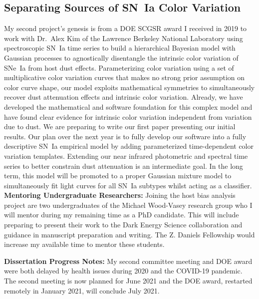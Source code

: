 \documentclass[modern]{aastex63}
\begin{document}
\subsection{Separating Sources of SN~Ia Color Variation}
My second project's genesis is from a DOE SCGSR award I received in 2019 to work with Dr.~Alex Kim of the Lawrence Berkeley National Laboratory using spectroscopic SN~Ia time series to build a hierarchical Bayesian model with Gaussian processes to agnostically disentangle the intrinsic color variation of SNe~Ia from host dust effects.
Parameterizing color variation using a set of multiplicative color variation curves that makes no strong prior assumption on color curve shape, our model exploits mathematical symmetries to simultaneously recover dust attenuation effects and intrinsic color variation.
Already, we have developed the mathematical and software foundation for this complex model and have found clear evidence for intrinsic color variation independent from variation due to dust.
We are preparing to write our first paper presenting our initial results.
Our plan over the next year is to fully develop our software into a fully descriptive SN~Ia empirical model by adding parameterized time-dependent color variation templates.
Extending our near infrared photometric and spectral time series to better constrain dust attenuation is an intermediate goal.
In the long term, this model will be promoted to a proper Gaussian mixture model to simultaneously fit light curves for all SN~Ia subtypes whilst acting as a classifier.\\

{\bf Mentoring Undergraduate Researchers:}
Joining the host bias analysis project are two undergraduates of the Michael Wood-Vasey research group who I will mentor during my remaining time as a PhD candidate.  This will include preparing to present their work to the Dark Energy Science collaboration and guidance in manuscript preparation and writing.  The Z. Daniels Fellowship would increase my available time to mentor these students. 

{\bf Dissertation Progress Notes:}
My second committee meeting and DOE award were both delayed by health issues during 2020 and the COVID-19 pandemic. 
The second meeting is now planned for June 2021 and the DOE award, restarted remotely in January 2021, will conclude July 2021. 

\newpage


\end{document}

